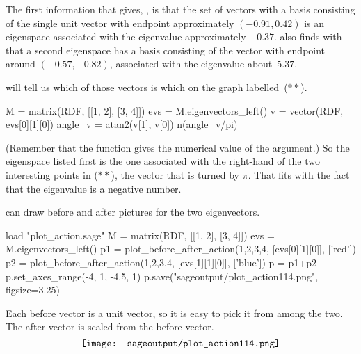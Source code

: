 The first information that \Sage{} gives, , 
is that the set of vectors with a basis consisting of the single unit
vector with endpoint approximately $(-0.91, 0.42)$  is an
eigenspace associated with the eigenvalue approximately $-0.37$.
\Sage{} also finds with  that a second eigenspace
has a basis consisting of the vector with endpoint around
$(-0.57, -0.82)$, associated with the
eigenvalue about~$5.37$. 

\Sage{} will tell us which of those vectors is which on the graph 
labelled~($**$).
\begin{sageoutput}
M = matrix(RDF, [[1, 2], [3, 4]])
evs = M.eigenvectors_left()
v = vector(RDF, evs[0][1][0])
angle_v = atan2(v[1], v[0]) 
n(angle_v/pi) 
\end{sageoutput}
(Remember that the  function gives the numerical value of
the argument.)
So the eigenspace listed first is the one associated with the right-hand
of the two interesting points in ($**$), the vector that is turned by
$\pi$.
That fits with the fact that the eigenvalue is a negative number.

\Sage{} can draw before and after pictures for the two eigenvectors.
\begin{sageoutput}[d,0,3]
load "plot_action.sage"  
M = matrix(RDF, [[1, 2], [3, 4]])
evs = M.eigenvectors_left()  
p1 = plot_before_after_action(1,2,3,4, [evs[0][1][0]], ['red']) 
p2 = plot_before_after_action(1,2,3,4, [evs[1][1][0]], ['blue']) 
p = p1+p2
p.set_axes_range(-4, 1, -4.5, 1) 
p.save("sageoutput/plot_action114.png", figsize=3.25)
\end{sageoutput}
\noindent
Each before vector is a unit vector, so it is easy to pick it from among the
two.
The after vector is scaled from the before vector.
\begin{equation*}
  \vcenteredhbox{\texttt{[image: sageoutput/plot\_action114.png]}}
\end{equation*}




